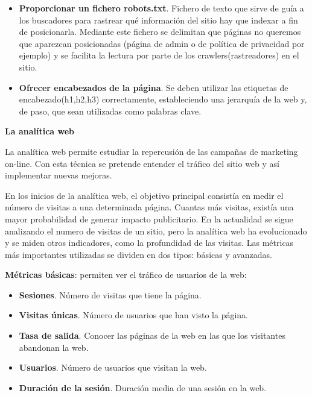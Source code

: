 \begin{itemize}
\item \textbf{Proporcionar un fichero robots.txt}. Fichero de texto que sirve de guía a los buscadores para rastrear  qué información del sitio hay que indexar a fin de posicionarla. Mediante este fichero se delimitan que páginas no queremos que aparezcan posicionadas (página de admin o de política de privacidad por ejemplo) y se facilita la lectura por parte de los crawlers(rastreadores) en el sitio.

\item \textbf{Ofrecer encabezados de la página}. Se deben utilizar las etiquetas de encabezado(h1,h2,h3) correctamente, estableciendo una jerarquía de la web y, de paso, que sean utilizadas como palabras clave.  


\end{itemize}

\vspace{5 mm}

\textbf{La analítica web}

\vspace{5 mm}

La analítica web permite estudiar la repercusión de las campañas de marketing on-line. Con esta técnica se pretende entender el tráfico del sitio web y así implementar nuevas mejoras.

\vspace{5 mm}

En los inicios de la analítica web, el objetivo principal consistía en medir el número de visitas a una determinada página. Cuantas más visitas, existía una mayor probabilidad de generar impacto publicitario. En la actualidad se sigue analizando el numero de visitas de un sitio, pero la analítica web ha evolucionado y se miden otros indicadores, como la profundidad de las visitas. Las métricas más importantes utilizadas se dividen en dos tipos: básicas y avanzadas.


\textbf{Métricas básicas}: permiten ver el tráfico de usuarios de la web: 

\begin{itemize}

\item \textbf{Sesiones}. Número de visitas que tiene la página.

\item \textbf{Visitas únicas}. Número de usuarios que han visto la página.

\item \textbf{Tasa de salida}. Conocer las páginas de la web en las que los visitantes abandonan la web.

\item \textbf{Usuarios}. Número de usuarios que visitan la web. 

\item \textbf{Duración de la sesión}. Duración media de una sesión en la web.

\end{itemize}

